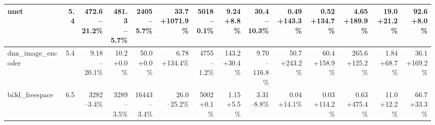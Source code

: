 \begin{table}[t]
{\begin{tabular}{lrrrrrrrrrrrrr}
\midrule
unet & 5.4 & \makecell[r]{472.6\\--21.2\%} & \makecell[r]{481.3\\--5.7\%} & \makecell[r]{2405\\--5.7\%} & \makecell[r]{33.7\\+1071.9\%} & \makecell[r]{5018\\--0.1\%} & \makecell[r]{9.24\\+8.8\%} & \makecell[r]{30.4\\--10.3\%} & \makecell[r]{0.49\\+143.3\%} & \makecell[r]{0.52\\+134.7\%} & \makecell[r]{4.65\\+189.9\%} & \makecell[r]{19.0\\+21.2\%} & \makecell[r]{92.6\\+8.0\%} \\
\midrule
dnn\_image\_encoder & 5.4 & \makecell[r]{9.18\\--20.1\%} & \makecell[r]{10.2\\+0.0\%} & \makecell[r]{50.0\\+0.0\%} & \makecell[r]{6.78\\+134.4\%} & \makecell[r]{4755\\--1.2\%} & \makecell[r]{143.2\\+30.4\%} & \makecell[r]{9.70\\--116.8\%} & \makecell[r]{50.7\\+243.2\%} & \makecell[r]{60.4\\+158.9\%} & \makecell[r]{265.6\\+125.2\%} & \makecell[r]{1.84\\+68.7\%} & \makecell[r]{36.1\\+169.2\%} \\
\midrule
bi3d\_freespace & 6.5 & \makecell[r]{3282\\--3.4\%} & \makecell[r]{3289\\--3.5\%} & \makecell[r]{16443\\--3.4\%} & \makecell[r]{26.0\\--25.2\%} & \makecell[r]{5002\\+0.1\%} & \makecell[r]{1.15\\+5.5\%} & \makecell[r]{3.31\\--8.8\%} & \makecell[r]{0.04\\+14.1\%} & \makecell[r]{0.03\\+114.2\%} & \makecell[r]{0.63\\+475.4\%} & \makecell[r]{11.0\\+12.2\%} & \makecell[r]{66.7\\+33.3\%} \\

\end{tabular}}
\end{table}
